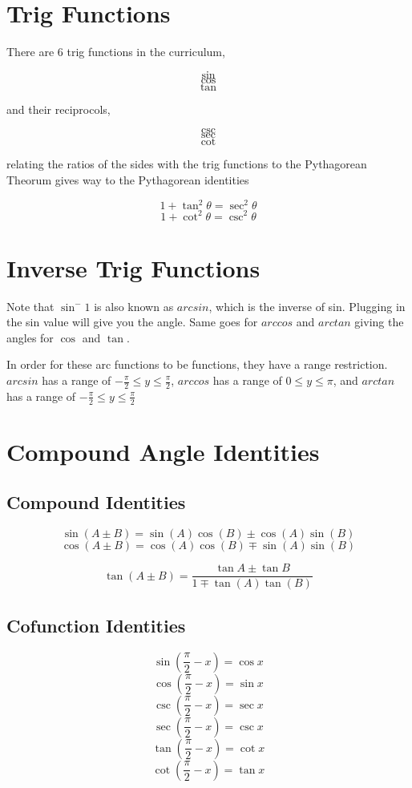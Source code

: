 \documentclass[../main.tex]{subfiles}
\begin{document}
\section{Trig Functions}

There are 6 trig functions in the curriculum,

\[ \sin \]
\[ \cos \]
\[ \tan \]

and their reciprocols,

\[ \csc \]
\[ \sec \]
\[ \cot \]

relating the ratios of the sides with the trig functions to the Pythagorean Theorum gives way to the Pythagorean identities

\[ 1 + \tan^2 \theta  = \sec^2 \theta \]
\[ 1 + \cot^2 \theta = \csc^2 \theta \]

\section{Inverse Trig Functions}

Note that $\sin^-1$ is also known as $arcsin$, which is the inverse of sin. Plugging in the sin value will give you the angle. Same goes for $arccos$ and $arctan$ giving the angles for $\cos$ and $\tan$. 

In order for these arc functions to be functions, they have a range restriction. $arcsin$ has a range of $-\frac{\pi}{2} \leq y \leq \frac{\pi}{2}$, $arccos$ has a range of $0 \leq y \leq \pi$, and $arctan$ has a range of $-\frac{\pi}{2} \leq y \leq \frac{\pi}{2}$ 

\section{Compound Angle Identities}

\subsection{Compound Identities}

\[ \sin(A \pm B) = \sin(A) \cos(B) \pm \cos(A) \sin(B) \]
\[ \cos(A \pm B) = \cos(A) \cos(B) \mp \sin(A) \sin(B) \]

\[ \tan(A \pm B) = \frac{\tan A \pm \tan B}{1 \mp \tan(A) \tan(B)} \]


\subsection{Cofunction Identities}

\[ \sin(\frac{\pi}{2} - x) = \cos x \]
\[ \cos(\frac{\pi}{2} - x) = \sin x \]
\[ \csc(\frac{\pi}{2} - x) = \sec x \]
\[ \sec(\frac{\pi}{2} - x) = \csc x \]
\[ \tan(\frac{\pi}{2} - x) = \cot x \]
\[ \cot(\frac{\pi}{2} - x) = \tan x \]
\end{document}
